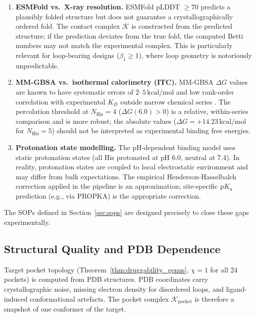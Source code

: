 \begin{enumerate}[label=\textbf{G\arabic*.}, leftmargin=1.5cm]
  \item \textbf{ESMFold vs.\ X-ray resolution.}  ESMFold pLDDT $\ge 70$
        predicts a plausibly folded structure but does not guarantee a
        crystallographically ordered fold.  The contact complex $\mathcal{K}$
        is constructed from the predicted structure; if the prediction deviates
        from the true fold, the computed Betti numbers may not match the
        experimental complex.  This is particularly relevant for loop-bearing
        designs ($\beta_1 \ge 1$), where loop geometry is notoriously
        unpredictable.

  \item \textbf{MM-GBSA vs.\ isothermal calorimetry (ITC).}  MM-GBSA
        $\Delta G$ values are known to have systematic errors of
        $2$--$5\,\text{kcal/mol}$ and low rank-order correlation with
        experimental $K_D$ outside narrow chemical series
        \cite{wang2019end}.  The percolation threshold at $N_{\text{His}} = 4$
        ($\Delta G(6.0) > 0$) is a relative, within-series comparison and is
        more robust; the absolute values ($\Delta G = +14.23\,\text{kcal/mol}$
        for $N_{\text{His}} = 5$) should not be interpreted as experimental
        binding free energies.

  \item \textbf{Protonation state modelling.}  The pH-dependent binding model
        uses static protonation states (all His protonated at pH 6.0, neutral
        at 7.4).  In reality, protonation states are coupled to local
        electrostatic environment and may differ from bulk expectations.  The
        empirical Henderson-Hasselbalch correction applied in the pipeline is
        an approximation; site-specific $\mathrm{p}K_a$ prediction (e.g., via
        PROPKA) is the appropriate correction.
\end{enumerate}

The SOPs defined in Section~\ref{sec:sops} are designed precisely to close
these gaps experimentally.

\subsection{Structural Quality and PDB Dependence}
\label{subsec:pdb_dependence}

Target pocket topology (Theorem~\ref{thm:druggability_genus}, $\chi = 1$ for
all 24 pockets) is computed from PDB structures.  PDB coordinates carry
crystallographic noise, missing electron density for disordered loops, and
ligand-induced conformational artefacts.  The pocket complex
$\mathcal{K}_{\text{pocket}}$ is therefore a snapshot of one conformer of the
target.

